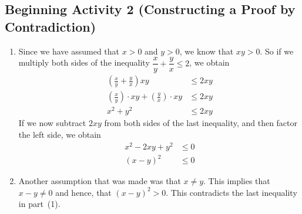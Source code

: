 \documentclass[11pt]{article}
\begin{document}
\subsection*{Beginning Activity 2 (Constructing a Proof by Contradiction)}
\begin{enumerate}
  \item Since we have assumed that $x > 0$ and $y > 0$, we know that $xy > 0$.  So if we multiply both sides of the inequality $\dfrac{x}{y} + \dfrac{y}{x} \leq 2$, we obtain
\begin{align*}
\left( \frac{x}{y} + \frac{y}{x} \right) xy &\leq 2xy \\
\left( \frac{x}{y} \right) \cdot xy + \left( \frac{y}{x} \right) \cdot xy &\leq 2xy \\
x^2 + y^2 &\leq 2xy
\end{align*}
If we now subtract $2xy$ from both sides of the last inequality, and then factor the left side, we obtain
\begin{align*}
x^2 - 2xy + y^2 &\leq 0 \\
\left( x - y \right)^2 &\leq 0
\end{align*}

\item Another assumption that was made was that $x \ne y$.  This implies that $x - y \ne 0$ and hence, that 
$(x - y)^2 > 0$.  This contradicts the last inequality in part~(1).
\end{enumerate}
\hbreak
\end{document}
